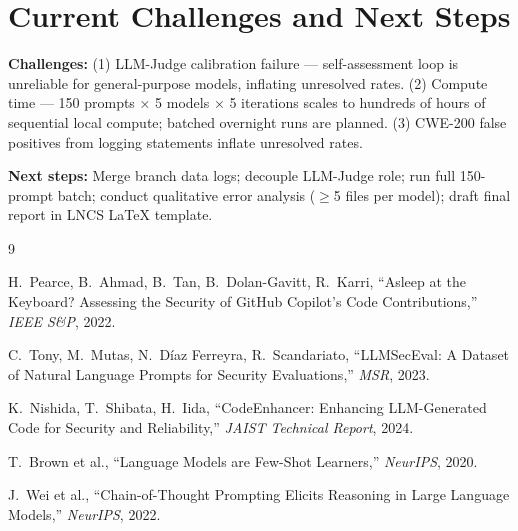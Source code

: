 \documentclass[11pt,a4paper]{article}
\begin{document}
\section{Current Challenges and Next Steps}

\textbf{Challenges:} (1) LLM-Judge calibration failure — self-assessment loop is unreliable for general-purpose models, inflating unresolved rates. (2) Compute time — 150 prompts × 5 models × 5 iterations scales to hundreds of hours of sequential local compute; batched overnight runs are planned. (3) CWE-200 false positives from logging statements inflate unresolved rates.

\textbf{Next steps:} Merge branch data logs; decouple LLM-Judge role; run full 150-prompt batch; conduct qualitative error analysis ($\geq$5 files per model); draft final report in LNCS LaTeX template.

\begin{thebibliography}{9}

H.~Pearce, B.~Ahmad, B.~Tan, B.~Dolan-Gavitt, R.~Karri,
``Asleep at the Keyboard? Assessing the Security of GitHub Copilot's Code Contributions,''
\textit{IEEE S\&P}, 2022.

C.~Tony, M.~Mutas, N.~Díaz Ferreyra, R.~Scandariato,
``LLMSecEval: A Dataset of Natural Language Prompts for Security Evaluations,''
\textit{MSR}, 2023.

K.~Nishida, T.~Shibata, H.~Iida,
``CodeEnhancer: Enhancing LLM-Generated Code for Security and Reliability,''
\textit{JAIST Technical Report}, 2024.

T.~Brown et al.,
``Language Models are Few-Shot Learners,''
\textit{NeurIPS}, 2020.

J.~Wei et al.,
``Chain-of-Thought Prompting Elicits Reasoning in Large Language Models,''
\textit{NeurIPS}, 2022.

\end{thebibliography}
\end{document}
